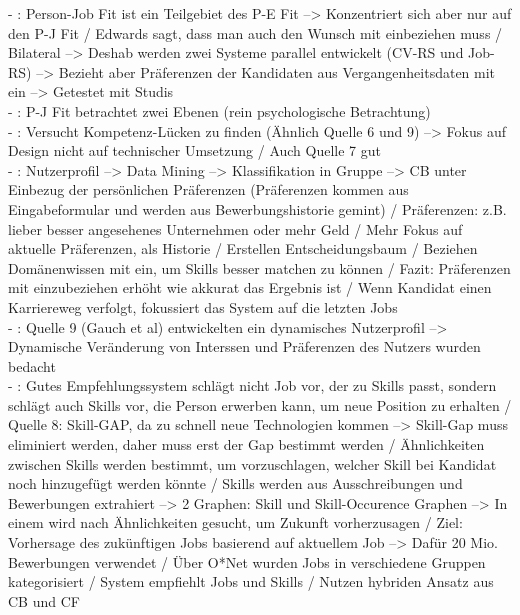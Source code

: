 - \cite{malinowski:2006}: Person-Job Fit ist ein Teilgebiet des P-E Fit --> Konzentriert sich aber nur auf den P-J Fit / Edwards \cite{edwards:1991} sagt, dass man auch den Wunsch mit einbeziehen muss / Bilateral --> Deshab werden zwei Systeme parallel entwickelt (CV-RS und Job-RS) --> Bezieht aber Präferenzen der Kandidaten aus Vergangenheitsdaten mit ein --> Getestet mit Studis \\
- \cite{edwards:1991}: P-J Fit betrachtet zwei Ebenen (rein psychologische Betrachtung) \\
- \cite{exploringJobRecommentations:2019}: Versucht Kompetenz-Lücken zu finden (Ähnlich Quelle 6 und 9) --> Fokus auf Design nicht auf technischer Umsetzung / Auch Quelle 7 gut \\
- \cite{applyingDataMining:2014}: Nutzerprofil --> Data Mining --> Klassifikation in Gruppe --> CB unter Einbezug der persönlichen Präferenzen (Präferenzen kommen aus Eingabeformular und werden aus Bewerbungshistorie gemint) / Präferenzen: z.B. lieber besser angesehenes Unternehmen oder mehr Geld / Mehr Fokus auf aktuelle Präferenzen, als Historie / Erstellen Entscheidungsbaum / Beziehen Domänenwissen mit ein, um Skills besser matchen zu können / Fazit: Präferenzen mit einzubeziehen erhöht wie akkurat das Ergebnis ist / Wenn Kandidat einen Karriereweg verfolgt, fokussiert das System auf die letzten Jobs\\
- \cite{dynamicUserProfile:2013}: Quelle 9 (Gauch et al) entwickelten ein dynamisches Nutzerprofil --> Dynamische Veränderung von Interssen und Präferenzen des Nutzers wurden bedacht \\
- \cite{aCombinedRepresentation:2018}: Gutes Empfehlungssystem schlägt nicht Job vor, der zu Skills passt, sondern schlägt auch Skills vor, die Person erwerben kann, um neue Position zu erhalten / Quelle 8: Skill-GAP, da zu schnell neue Technologien kommen --> Skill-Gap muss eliminiert werden, daher muss erst der Gap bestimmt werden / Ähnlichkeiten zwischen Skills werden bestimmt, um vorzuschlagen, welcher Skill bei Kandidat noch hinzugefügt werden könnte / Skills werden aus Ausschreibungen und Bewerbungen extrahiert --> 2 Graphen: Skill und Skill-Occurence Graphen --> In einem wird nach Ähnlichkeiten gesucht, um Zukunft vorherzusagen / Ziel: Vorhersage des zukünftigen Jobs basierend auf aktuellem Job --> Dafür 20 Mio. Bewerbungen verwendet / Über O*Net wurden Jobs in verschiedene Gruppen kategorisiert / System empfiehlt Jobs und Skills / Nutzen hybriden Ansatz aus CB und CF

